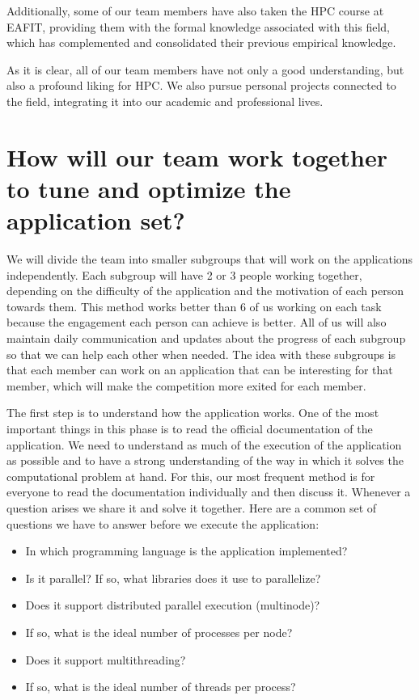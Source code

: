 \documentclass[11pt,a4paper,twocolumn]{article}
\begin{document}
Additionally, some of our team members have also taken the HPC course at EAFIT, providing them with the formal knowledge associated with this field, which has complemented and consolidated their previous empirical knowledge.

As it is clear, all of our team members have not only a good understanding, but also a profound liking for HPC. We also pursue personal projects connected to the field, integrating it into our academic and professional lives.


\section{How will our team work together to tune and optimize the application set?}

We will divide the team into smaller subgroups that will work on the applications independently. Each subgroup will have 2 or 3 people working together, depending on the difficulty of the application and the motivation of each person towards them. This method works better than 6 of us working on each task because the engagement each person can achieve is better. All of us will also maintain daily communication and updates about the progress of each subgroup so that we can help each other when needed. The idea with these subgroups is that each member can work on an application that can be interesting for that member, which will make the competition more exited for each member.

The first step is to understand how the application works. One of the most important things in this phase is to read the official documentation of the application. We need to understand as much of the execution of the application as possible and to have a strong understanding of the way in which it solves the computational problem at hand. For this, our most frequent method is for everyone to read the documentation individually and then discuss it. Whenever a question arises we share it and solve it together. Here are a common set of questions we have to answer before we execute the application:
\begin{itemize}
	\item In which programming language is the application implemented?
	\item Is it parallel? If so, what libraries does it use to parallelize?
	\item Does it support distributed parallel execution (multinode)?
	\item If so, what is the ideal number of processes per node?
	\item Does it support multithreading?
	\item If so, what is the ideal number of threads per process?
\end{itemize}
\end{document}
